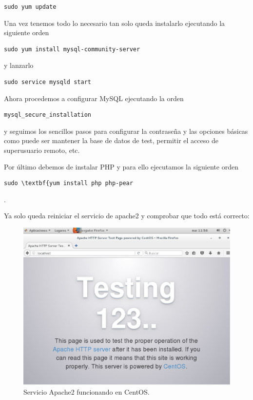 \begin{verbatim}sudo yum update\end{verbatim}
Una vez tenemos todo lo necesario tan solo queda instalarlo ejecutando la siguiente orden
\begin{verbatim}sudo yum install mysql-community-server\end{verbatim} y lanzarlo \begin{verbatim}sudo service mysqld start\end{verbatim} Ahora procedemos a configurar MySQL ejecutando la orden \begin{verbatim}mysql_secure_installation\end{verbatim} y seguimos los sencillos pasos para configurar la contraseña y las opciones básicas como puede ser mantener la base de datos de test, permitir el acceso de superusuario remoto, etc.

Por último debemos de instalar PHP y para ello ejecutamos la siguiente orden \begin{verbatim}sudo \textbf{yum install php php-pear\end{verbatim}.

Ya solo queda reiniciar el servicio de apache2 y comprobar que todo está correcto:
\begin{figure}[H]
	\centering
	\includegraphics[scale=0.6]{apache2-centos-works.jpg}
	\caption{Servicio Apache2 funcionando en CentOS. \label{fig:figura18}}
\end{figure}
